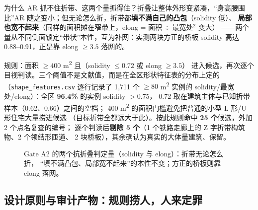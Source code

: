 为什么 AR 抓不住折带、这两个量抓得住？折叠让整体外形变紧凑，``身高腰围比''AR
随之变小；但无论怎么折，折带都\textbf{填不满自己的凸包}（solidity 低）、
\textbf{局部也宽不起来}（同样的面积摊在窄带上，elong = 面积 $\div$ 最宽处$^2$ 变大）
——两个量从不同侧面锁定``带状''本性，互为补网：实测两块方正的桥板
solidity 高达 0.88--0.91，正是靠 elong $\geq3.5$ 落网的。

规则：面积 $\geq 400$ m\textsuperscript{2} 且（solidity $\leq 0.72$ 或 elong $\geq 3.5$）
进入候选，再次逐个目视判读。三个阈值不是文献值，而是在全区形状特征表的分布上定的
（\texttt{shape\_features.csv} 逐行记录了 1{,}711 个 $\geq80$ m\textsuperscript{2}
实例的 solidity/最宽处/elong）：全区 \textbf{96.4\%} 的实例 solidity $>0.75$，
0.72 取在建筑主体与已知折带样本（0.62、0.66）之间的空档；
400 m\textsuperscript{2} 的面积门槛避免把普通的小型 L 形/U 形住宅大量捞进候选
（目标折带全都远大于此）。按此规则命中 \textbf{25 个}候选，外加 2 个点名复查的编号；
逐个判读后\textbf{剔除 5 个}（1 个铁路走廊上的 Z 字折带构筑物、2 个领结形匝道、
2 块桥板），其余确认为真实的大体量建筑、保留。

\begin{figure}[H]
\centering
{}
\caption{Gate A2 的两个抗折叠判定量（solidity 与 elong）：折带无论怎么折，
``填不满凸包、局部宽不起来''的本性不变；方正的桥板则靠 elong 落网。}
\label{fig:solidity}
\end{figure}

\subsection{设计原则与审计产物：规则捞人，人来定罪}

